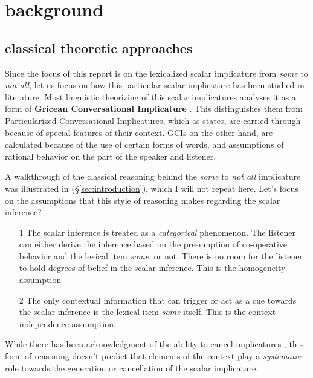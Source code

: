 \documentclass[10pt, biblatex, linguex]{report}
\begin{document}
\section{background}
\label{sec:background}

\subsection{classical theoretic approaches}

Since the focus of this report is on the lexicalized scalar implicature from
\textit{some} to \textit{not all}, let us focus on how this particular scalar
implicature has been studied in literature. Most linguistic theorizing of this
scalar implicatures analyses it as a form of
\textbf{Gricean Conversational Implicature} \citep{grice_logic_1975,
horn_towards_1984, levinson2000presumptive}. This distinguishes them from
Particularized Conversational Implicatures, which as \citet{grice_logic_1975} states,
are carried through because of special features of their context. GCIs on the
other hand, are calculated because of the use of certain forms of words, and
assumptions of rational behavior on the part of the speaker and listener.

A walkthrough of the classical reasoning behind the \textit{some} to \textit{not
all} implicature was illustrated in (\S\ref{sec:introduction}), which
I will not repeat here. Let's focus on the assumptions that this style of
reasoning makes regarding the scalar inference?

\begin{enumerate}
    \item[1] The scalar inference is treated as a \textit{categorical}
             phenomenon. The listener can either derive the inference based on
             the presumption of co-operative behavior and the lexical item
             \textit{some}, or not. There is no room for the listener to
             hold degrees of belief in the scalar inference. This is the
             {\rmsc homogeneity} assumption
    \item[2] The only contextual information that can trigger or act as a cue
             towards the scalar inference is the lexical item \textit{some}
             itself. This is the {\rmsc context independence} assumption.
\end{enumerate}

While there has been acknowledgment of the ability to cancel implicatures
\citep{horn_towards_1984, levinson2000presumptive}, this form of reasoning
doesn't predict that elements of the context play a \textit{systematic} role
towards the generation or cancellation of the scalar implicature.
\end{document}

